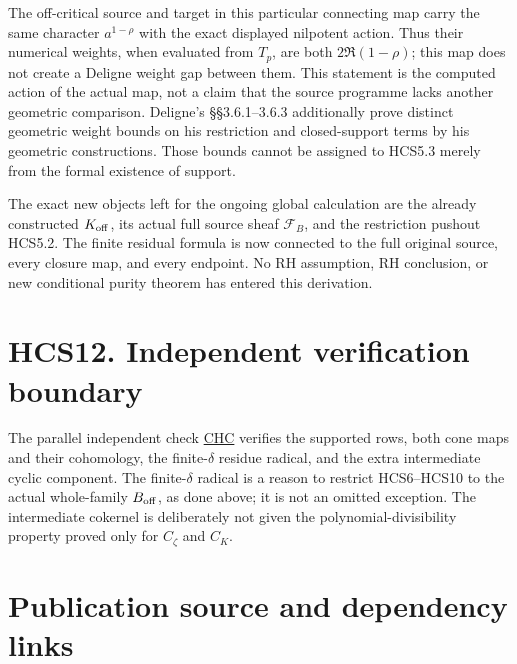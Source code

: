 The off-critical source and target in this particular connecting map
carry the same character \(a^{1-\rho}\) with the exact displayed
nilpotent action. Thus their numerical weights, when evaluated from
\(T_p\), are both \(2\Re(1-\rho)\); this map does not create a Deligne
weight gap between them. This statement is the computed action of the
actual map, not a claim that the source programme lacks another
geometric comparison. Deligne's §§3.6.1--3.6.3 additionally prove
distinct geometric weight bounds on his restriction and closed-support
terms by his geometric constructions. Those bounds cannot be assigned to
HCS5.3 merely from the formal existence of support.

The exact new objects left for the ongoing global calculation are the
already constructed \(K_{\rm off}\), its actual full source sheaf
\(\mathcal F_B\), and the restriction pushout HCS5.2. The finite
residual formula is now connected to the full original source, every
closure map, and every endpoint. No RH assumption, RH conclusion, or new
conditional purity theorem has entered this derivation.

\section{HCS12. Independent verification
boundary}\label{hcs12.-independent-verification-boundary}

The parallel independent check
\href{https://github.com/KokunoYumeto/zeta-function-research-reader/blob/main/workbenches/splitzero-tandem/continuations/20260925-full-source-tensor-and-original-divisor/counterfactual/HILBERT_CLOSURE_SUPPORT_INDEPENDENT_CHECK.md}{CHC}
verifies the supported rows, both cone maps and their cohomology, the
finite-\(\delta\) residue radical, and the extra intermediate cyclic
component. The finite-\(\delta\) radical is a reason to restrict
HCS6--HCS10 to the actual whole-family \(B_{\rm off}\), as done above;
it is not an omitted exception. The intermediate cokernel is
deliberately not given the polynomial-divisibility property proved only
for \(C_\zeta\) and \(C_K\).

\section{Publication source and dependency
links}\label{publication-source-and-dependency-links-19}

